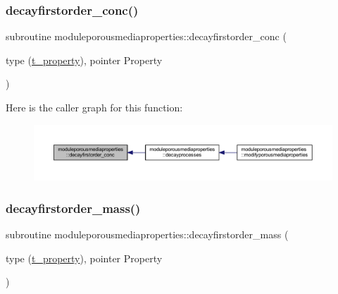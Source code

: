 \subsubsection{\texorpdfstring{decayfirstorder\+\_\+conc()}{decayfirstorder\_conc()}}
{\footnotesize\ttfamily subroutine moduleporousmediaproperties\+::decayfirstorder\+\_\+conc (\begin{DoxyParamCaption}\item[{type (\mbox{\hyperlink{structmoduleporousmediaproperties_1_1t__property}{t\+\_\+property}}), pointer}]{Property }\end{DoxyParamCaption})\hspace{0.3cm}{\ttfamily [private]}}

Here is the caller graph for this function\+:\nopagebreak
\begin{figure}[H]
\begin{center}
\leavevmode
\includegraphics[width=350pt]{namespacemoduleporousmediaproperties_a3c5193c49fa27b216424d2162798b41b_icgraph}
\end{center}
\end{figure}
\mbox{\label{namespacemoduleporousmediaproperties_accf60e0dd2d0f11fb4815a77bd7db219}} 
\subsubsection{\texorpdfstring{decayfirstorder\+\_\+mass()}{decayfirstorder\_mass()}}
{\footnotesize\ttfamily subroutine moduleporousmediaproperties\+::decayfirstorder\+\_\+mass (\begin{DoxyParamCaption}\item[{type (\mbox{\hyperlink{structmoduleporousmediaproperties_1_1t__property}{t\+\_\+property}}), pointer}]{Property }\end{DoxyParamCaption})\hspace{0.3cm}{\ttfamily [private]}}

